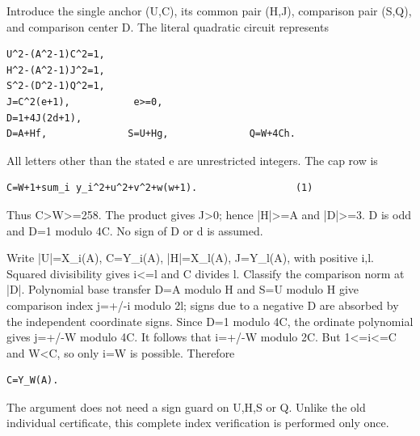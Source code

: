 Introduce the single anchor (U,C), its common pair (H,J), comparison pair (S,Q), and comparison center D. The literal quadratic circuit represents



\begin{verbatim}
U^2-(A^2-1)C^2=1,
H^2-(A^2-1)J^2=1,
S^2-(D^2-1)Q^2=1,
J=C^2(e+1),           e>=0,
D=1+4J(2d+1),
D=A+Hf,              S=U+Hg,              Q=W+4Ch.
\end{verbatim}

All letters other than the stated e are unrestricted integers. The cap row is



\begin{verbatim}
C=W+1+sum_i y_i^2+u^2+v^2+w(w+1).                 (1)
\end{verbatim}

Thus C\textgreater{}\allowbreak{}W\textgreater{}\allowbreak{}=\allowbreak{}258. The product gives J\textgreater{}\allowbreak{}0; hence |H|\textgreater{}\allowbreak{}=\allowbreak{}A and |D|\textgreater{}\allowbreak{}=\allowbreak{}3. D is odd and D=\allowbreak{}1 modulo 4C. No sign of D or d is assumed.



Write |U|=\allowbreak{}X\_\allowbreak{}i(A), C=\allowbreak{}Y\_\allowbreak{}i(A), |H|=\allowbreak{}X\_\allowbreak{}l(A), J=\allowbreak{}Y\_\allowbreak{}l(A), with positive i,l. Squared divisibility gives i\textless{}\allowbreak{}=\allowbreak{}l and C divides l. Classify the comparison norm at |D|. Polynomial base transfer D=\allowbreak{}A modulo H and S=\allowbreak{}U modulo H give comparison index j=\allowbreak{}+\allowbreak{}/\allowbreak{}-i modulo 2l; signs due to a negative D are absorbed by the independent coordinate signs. Since D=\allowbreak{}1 modulo 4C, the ordinate polynomial gives j=\allowbreak{}+\allowbreak{}/\allowbreak{}-W modulo 4C. It follows that i=\allowbreak{}+\allowbreak{}/\allowbreak{}-W modulo 2C. But 1\textless{}\allowbreak{}=\allowbreak{}i\textless{}\allowbreak{}=\allowbreak{}C and W\textless{}\allowbreak{}C, so only i=\allowbreak{}W is possible. Therefore



\begin{verbatim}
C=Y_W(A).
\end{verbatim}

The argument does not need a sign guard on U,H,S or Q. Unlike the old individual certificate, this complete index verification is performed only once.




